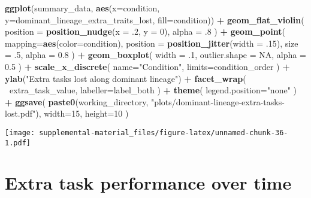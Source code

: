 \documentclass[]{book}
\newenvironment{Shaded}{\begin{snugshade}}{\end{snugshade}}
\newcommand{\DataTypeTok}[1]{\textcolor[rgb]{0.13,0.29,0.53}{#1}}
\newcommand{\DecValTok}[1]{\textcolor[rgb]{0.00,0.00,0.81}{#1}}
\newcommand{\FloatTok}[1]{\textcolor[rgb]{0.00,0.00,0.81}{#1}}
\newcommand{\KeywordTok}[1]{\textcolor[rgb]{0.13,0.29,0.53}{\textbf{#1}}}
\newcommand{\NormalTok}[1]{#1}
\newcommand{\OperatorTok}[1]{\textcolor[rgb]{0.81,0.36,0.00}{\textbf{#1}}}
\newcommand{\OtherTok}[1]{\textcolor[rgb]{0.56,0.35,0.01}{#1}}
\newcommand{\StringTok}[1]{\textcolor[rgb]{0.31,0.60,0.02}{#1}}
\begin{document}
\begin{Shaded}
\begin{Highlighting}[]
\KeywordTok{ggplot}\NormalTok{(summary_data, }\KeywordTok{aes}\NormalTok{(}\DataTypeTok{x=}\NormalTok{condition, }\DataTypeTok{y=}\NormalTok{dominant_lineage_extra_traits_lost, }\DataTypeTok{fill=}\NormalTok{condition)) }\OperatorTok{+}
\StringTok{  }\KeywordTok{geom_flat_violin}\NormalTok{(}
    \DataTypeTok{position =} \KeywordTok{position_nudge}\NormalTok{(}\DataTypeTok{x =} \FloatTok{.2}\NormalTok{, }\DataTypeTok{y =} \DecValTok{0}\NormalTok{),}
    \DataTypeTok{alpha =} \FloatTok{.8}
\NormalTok{  ) }\OperatorTok{+}
\StringTok{  }\KeywordTok{geom_point}\NormalTok{(}
    \DataTypeTok{mapping=}\KeywordTok{aes}\NormalTok{(}\DataTypeTok{color=}\NormalTok{condition),}
    \DataTypeTok{position =} \KeywordTok{position_jitter}\NormalTok{(}\DataTypeTok{width =} \FloatTok{.15}\NormalTok{),}
    \DataTypeTok{size =} \FloatTok{.5}\NormalTok{,}
    \DataTypeTok{alpha =} \FloatTok{0.8}
\NormalTok{  ) }\OperatorTok{+}
\StringTok{  }\KeywordTok{geom_boxplot}\NormalTok{(}
    \DataTypeTok{width =} \FloatTok{.1}\NormalTok{,}
    \DataTypeTok{outlier.shape =} \OtherTok{NA}\NormalTok{,}
    \DataTypeTok{alpha =} \FloatTok{0.5}
\NormalTok{  ) }\OperatorTok{+}
\StringTok{  }\KeywordTok{scale_x_discrete}\NormalTok{(}
    \DataTypeTok{name=}\StringTok{"Condition"}\NormalTok{,}
    \DataTypeTok{limits=}\NormalTok{condition_order}
\NormalTok{  ) }\OperatorTok{+}
\StringTok{  }\KeywordTok{ylab}\NormalTok{(}\StringTok{"Extra tasks lost along dominant lineage"}\NormalTok{) }\OperatorTok{+}
\StringTok{  }\KeywordTok{facet_wrap}\NormalTok{(}
    \OperatorTok{~}\NormalTok{extra_task_value,}
    \DataTypeTok{labeller=}\NormalTok{label_both}
\NormalTok{  ) }\OperatorTok{+}
\StringTok{  }\KeywordTok{theme}\NormalTok{(}
    \DataTypeTok{legend.position=}\StringTok{"none"}
\NormalTok{  ) }\OperatorTok{+}
\StringTok{  }\KeywordTok{ggsave}\NormalTok{(}
    \KeywordTok{paste0}\NormalTok{(working_directory, }\StringTok{"plots/dominant-lineage-extra-tasks-lost.pdf"}\NormalTok{),}
    \DataTypeTok{width=}\DecValTok{15}\NormalTok{,}
    \DataTypeTok{height=}\DecValTok{10}
\NormalTok{  )}
\end{Highlighting}
\end{Shaded}

\texttt{[image: supplemental-material\_files/figure-latex/unnamed-chunk-36-1.pdf]}

\hypertarget{extra-task-performance-over-time}{%
\section{Extra task performance over time}\label{extra-task-performance-over-time}}


\end{document}
